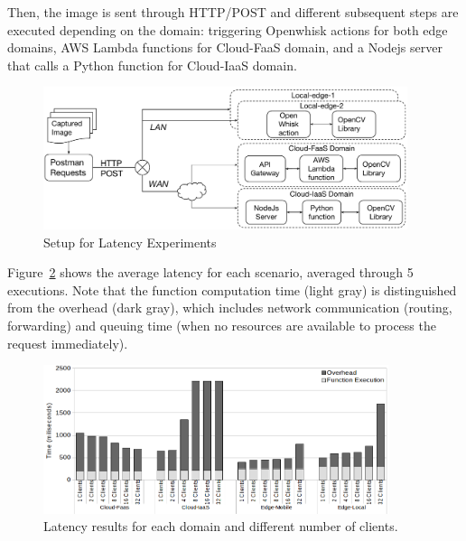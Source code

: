 Then, the image is sent through HTTP/POST and different subsequent steps are executed depending on the domain: triggering Openwhisk actions for both edge domains, AWS Lambda functions for Cloud-FaaS domain, and a Nodejs server that calls a Python function for Cloud-IaaS domain.



\begin{figure}[htb]
	
	\centering
	\includegraphics[width=0.95\textwidth]{figs/experimental-setup.pdf}
	\caption{Setup for Latency Experiments}
	\label{fig:exp-setup1}
\end{figure}


 Figure~\ref{fig:latency-domains} shows the average latency for each scenario, averaged through 5 executions. Note that the function computation time (light gray) is distinguished from the overhead (dark gray), which includes network communication (routing, forwarding) and queuing time (when no resources are available to process the request immediately). 

\begin{figure}
	
	\centering
	\includegraphics[width=0.9\textwidth]{figs/latency-domains}
	\caption{Latency results for each domain and different number of clients.}
	\label{fig:latency-domains}
\end{figure}


